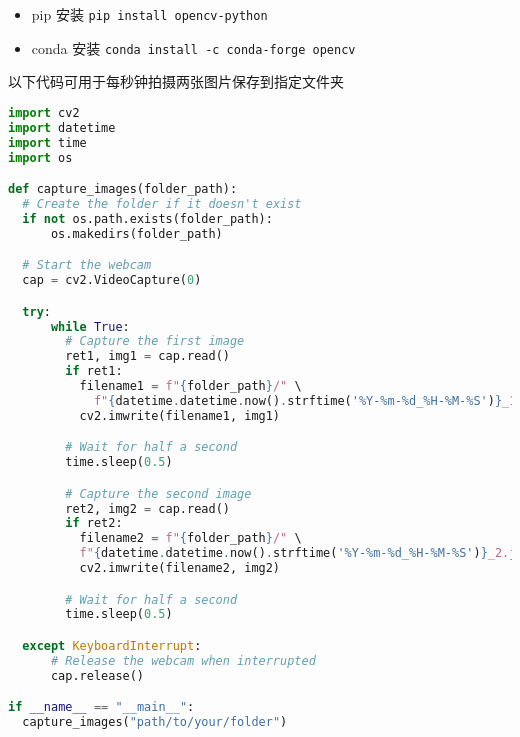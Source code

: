 
\begin{issues}
\issueDraft
\end{issues}

\begin{itemize}
\item pip 安装 \verb`pip install opencv-python`
\item conda 安装 \verb`conda install -c conda-forge opencv`
\end{itemize}

以下代码可用于每秒钟拍摄两张图片保存到指定文件夹
\begin{lstlisting}[language=python,caption=camera.py]
import cv2
import datetime
import time
import os

def capture_images(folder_path):
  # Create the folder if it doesn't exist
  if not os.path.exists(folder_path):
      os.makedirs(folder_path)

  # Start the webcam
  cap = cv2.VideoCapture(0)

  try:
      while True:
        # Capture the first image
        ret1, img1 = cap.read()
        if ret1:
          filename1 = f"{folder_path}/" \
  			f"{datetime.datetime.now().strftime('%Y-%m-%d_%H-%M-%S')}_1.jpg"
          cv2.imwrite(filename1, img1)

        # Wait for half a second
        time.sleep(0.5)

        # Capture the second image
        ret2, img2 = cap.read()
        if ret2:
          filename2 = f"{folder_path}/" \
          f"{datetime.datetime.now().strftime('%Y-%m-%d_%H-%M-%S')}_2.jpg"
          cv2.imwrite(filename2, img2)

        # Wait for half a second
        time.sleep(0.5)

  except KeyboardInterrupt:
      # Release the webcam when interrupted
      cap.release()

if __name__ == "__main__":
  capture_images("path/to/your/folder")
\end{lstlisting}
